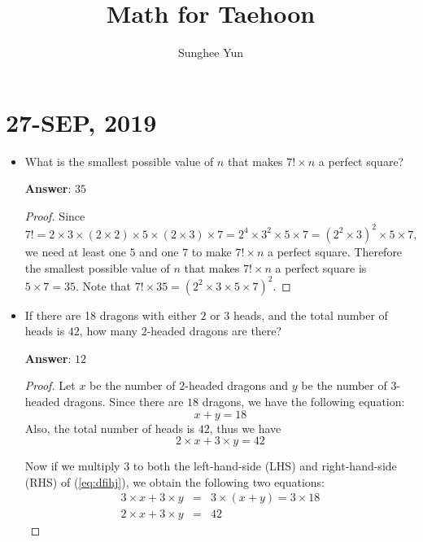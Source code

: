 \documentclass{article}
\title{Math for Taehoon}
\author{Sunghee Yun}
\begin{document}
\maketitle

\section{27-SEP, 2019}
\begin{itemize}
\item What is the smallest possible value of $n$ that makes $7! \times n$ a perfect square?

{\bf Answer}: $35$

\begin{proof}
Since
\begin{equation}
7! = 2 \times 3 \times (2 \times 2 ) \times 5 \times (2\times 3) \times 7
=  2^4 \times 3^2 \times 5 \times 7
=  (2^2 \times 3)^2 \times 5 \times 7,
\end{equation}
we need at least one $5$ and one $7$ to make $7!\times n$ a perfect square.
Therefore the smallest possible value of $n$ that makes $7! \times n$ a perfect square
is $5\times 7 = 35$.
Note that $7! \times 35 = (2^2 \times 3 \times 5 \times 7)^2$.

\end{proof}

\item If there are 18 dragons with either $2$ or $3$ heads,
and the total number of heads is $42$,
how many $2$-headed dragons are there? 

{\bf Answer}: $12$

\begin{proof}
Let $x$ be the number of $2$-headed dragons
and
$y$ be the number of $3$-headed dragons.
Since there are $18$ dragons, we have the following equation:
\begin{equation}
\label{eq:dfihj}
x + y = 18
\end{equation}
Also, the total number of heads is $42$, thus we have
\begin{equation}
2 \times x + 3 \times y = 42
\end{equation}

Now if we multiply $3$ to both the left-hand-side (LHS) and right-hand-side (RHS) of (\ref{eq:dfihj}),
we obtain the following two equations:
\begin{eqnarray}
3\times x + 3\times y &=& 3\times(x+y) = 3\times 18
\label{eq:oges}
\\
2 \times x + 3 \times y &=& 42
\label{eq:uydh}
\end{eqnarray}


\end{proof}
\end{itemize}
\end{document}
